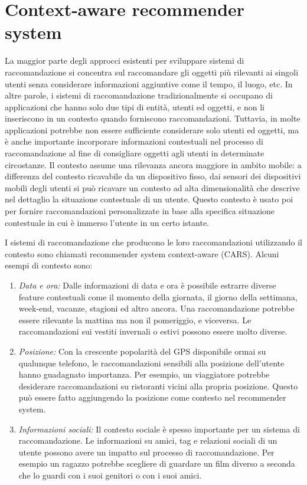 \documentclass[12pt,italian]{report}
\begin{document}
\section{Context-aware recommender system}
La maggior parte degli approcci esistenti per sviluppare sistemi di raccomandazione si concentra sul raccomandare gli oggetti più rilevanti ai singoli utenti senza considerare informazioni aggiuntive come il tempo, il luogo, etc. In altre parole, i sistemi di raccomandazione tradizionalmente si occupano di applicazioni che hanno solo due tipi di entità, utenti ed oggetti, e non li inseriscono in un contesto quando forniscono raccomandazioni. Tuttavia, in molte applicazioni potrebbe non essere sufficiente considerare solo utenti ed oggetti, ma è anche importante incorporare informazioni contestuali nel processo di raccomandazione al fine di consigliare oggetti agli utenti in determinate circostanze. Il contesto assume una rilevanza ancora maggiore in ambito mobile: a differenza del contesto ricavabile da un dispositivo fisso, dai sensori dei dispositivi mobili degli utenti si può ricavare un contesto ad alta dimensionalità che descrive nel dettaglio la situazione contestuale di un utente. Questo contesto è usato poi per fornire raccomandazioni personalizzate in base alla specifica situazione contestuale in cui è immerso l'utente in un certo istante.

I sistemi di raccomandazione che producono le loro raccomandazioni utilizzando il contesto sono chiamati recommender system context-aware (CARS). Alcuni esempi di contesto sono:

\begin{enumerate}
 \item \textit{Data e ora:} Dalle informazioni di data e ora è possibile estrarre diverse feature contestuali come il momento della giornata, il giorno della settimana, week-end, vacanze, stagioni ed altro ancora. Una raccomandazione potrebbe essere rilevante la mattina ma non il pomeriggio, e viceversa. Le raccomandazioni sui vestiti invernali o estivi possono essere molto diverse.
 \item \textit{Posizione:} Con la crescente popolarità del GPS disponibile ormai su qualunque telefono, le raccomandazioni sensibili alla posizione dell'utente hanno guadagnato importanza. Per esempio, un viaggiatore potrebbe desiderare raccomandazioni su ristoranti vicini alla propria posizione. Questo può essere fatto aggiungendo la posizione come contesto nel recommender system.
 \item \textit{Informazioni sociali:} Il contesto sociale è spesso importante per un sistema di raccomandazione. Le informazioni su amici, tag e relazioni sociali di un utente possono avere un impatto sul processo di raccomandazione. Per esempio un ragazzo potrebbe scegliere di guardare un film diverso a seconda che lo guardi con i suoi genitori o con i suoi amici.
\end{enumerate} 
\end{document}
